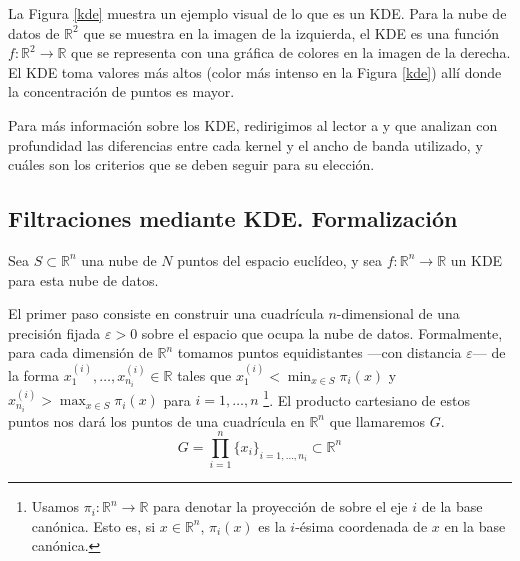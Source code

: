 \documentclass[12pt,a4paper,twoside]{article} %
\theoremstyle{plain}
\theoremstyle{definition}
\newcommand{\R}{\mathbb{R}}
\newcommand{\map}[3]{#1 \colon #2 \to #3}
\begin{document}
La Figura \ref{kde} muestra un ejemplo visual de lo que es un KDE. Para la nube de datos de $\R^2$ que se muestra en la imagen de la izquierda, el KDE es una función $\map{f}{\R^2}{\R}$ que se representa con una gráfica de colores en la imagen de la derecha. El KDE toma valores más altos (color más intenso en la Figura \ref{kde}) allí donde la concentración de puntos es mayor.

Para más información sobre los KDE, redirigimos al lector a \cite{Scheid} y \cite{Chouaib} que analizan con profundidad las diferencias entre cada kernel y el ancho de banda utilizado, y cuáles son los criterios que se deben seguir para su elección.

\subsection{Filtraciones mediante KDE. Formalización}

Sea $S \subset \R^n $ una nube de $N$ puntos del espacio euclídeo, y sea $\map{f}{\R^n}{\R}$ un KDE para esta nube de datos.

El primer paso consiste en construir una cuadrícula $n$-dimensional de una precisión fijada $\varepsilon>0$ sobre el espacio que ocupa la nube de datos. Formalmente, para cada dimensión de $\R^n$ tomamos puntos equidistantes ---con distancia $\varepsilon$--- de la forma $x_1^{(i)},\dots,x_{n_i}^{(i)}\in \R$ tales que $x_1^{(i)}<\min_{x\in S}{\pi_i(x)}$ y $x_{n_i}^{(i)}>\max_{x\in S}{\pi_i(x)}$ para $i=1,\dots,n$ \footnote{Usamos $\map{\pi_i}{\R^n}{\R}$ para denotar la proyección de sobre el eje $i$ de la base canónica. Esto es, si $x\in\R^n$, $\pi_i(x)$ es la $i$-ésima coordenada de $x$ en la base canónica.}. El producto cartesiano de estos puntos nos dará los puntos de una cuadrícula en $\R^n$ que llamaremos $G$.
$$ G = \prod_{i=1}^n \{x_i\}_{i=1,\dots,n_i} \subset \R^n $$
\end{document}
